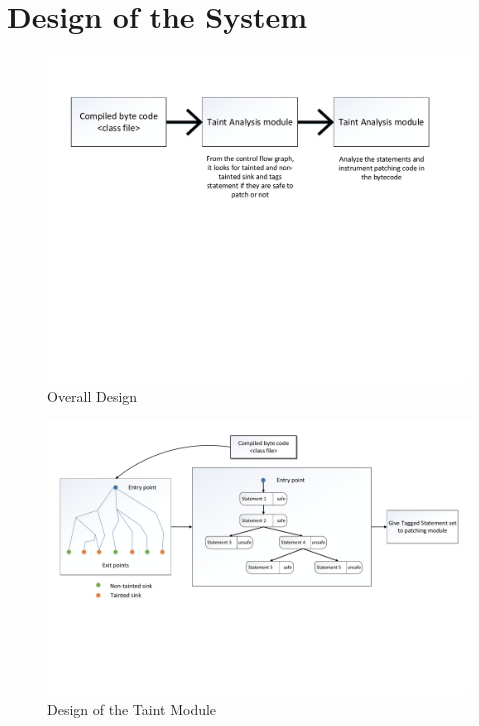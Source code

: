 \doublespacing

\chapter{Design of the System}
\label{chapter:SystemDesign}


\begin{figure}[!htb]
\centering
\includegraphics[width=5.2in]{images/OverallDesign.pdf}
\caption{Overall Design}
\label{fig:overallDesign}
\end{figure}


% 

\begin{figure}
\centering
  \includegraphics[width= 7.0in]{images/TaintModule.pdf}
  \caption{Design of the Taint Module}
  \label{fig:TaintModule}
\end{figure}



